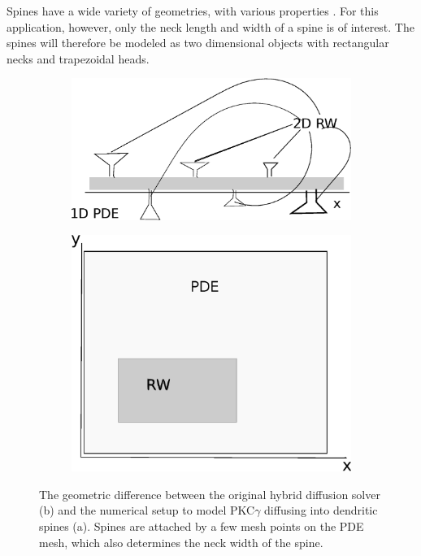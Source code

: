 \noindent Spines have a wide variety of geometries, with various properties \cite{arellano2007ultrastructure}. For this application, however, only the neck length and width of a spine is of interest. The spines will therefore be modeled as two dimensional objects with rectangular necks and trapezoidal heads. 
\begin{figure}[H]
 \centering
 \begin{subfigure}{0.48\textwidth}
  \includegraphics[width=\textwidth]{Figures/dendrite_spine_model.eps}
  \caption{}
 \end{subfigure}
 \begin{subfigure}{0.48\textwidth}
  \includegraphics[width=\textwidth]{Figures/hybrid_model_principle.eps}
  \caption{}
 \end{subfigure}
 \caption[Difference between hybrid diffusion solver and dendrite - spine diffusion model]{The geometric difference between the original hybrid diffusion solver (b) and the numerical setup to model PKC$\gamma$ diffusing into dendritic spines (a). Spines are attached by a few mesh points on the PDE mesh, which also determines the neck width of the spine.}
 \label{application:geometry_difference}
\end{figure}

